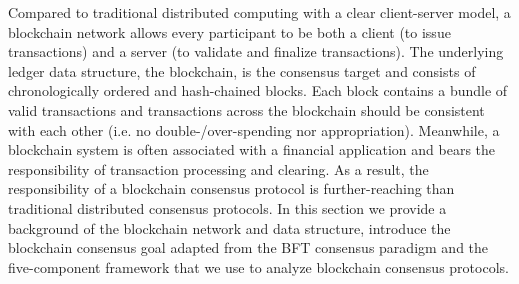 \label{sec:blockchain-consensus}
Compared to traditional distributed computing with a clear client-server model, a blockchain network allows every participant to be both a client (to issue transactions) and a server (to validate and finalize transactions). The underlying ledger data structure, the blockchain, is the consensus target and consists of chronologically ordered and hash-chained blocks. Each block contains a bundle of valid transactions and transactions across the blockchain should be consistent with each other (i.e. no double-/over-spending nor appropriation). 
Meanwhile, a blockchain system is often associated with a financial application and bears the responsibility of transaction processing and clearing. As a result, the responsibility of a blockchain consensus protocol is further-reaching than traditional distributed consensus protocols. In this section we provide a background of the blockchain network and data structure, introduce the blockchain consensus goal adapted from the BFT consensus paradigm and the five-component framework that we use to analyze blockchain consensus protocols.

